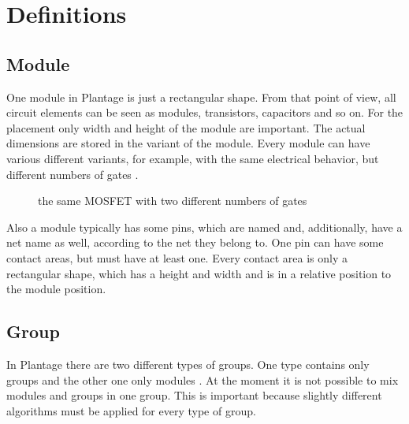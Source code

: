 \chapter{Definitions}

\section{Module}
One module in Plantage is just a rectangular shape. From that point of view, all circuit elements can be seen as modules, transistors, capacitors and so on. For the placement only width and height of the module are important. The actual dimensions are stored in the variant of the module. Every module can have various different variants, for example, with the same electrical behavior, but different numbers of gates .

\begin{figure}
	\centering
	
	\caption{the same MOSFET with two different numbers of gates}
	\label{fig:modules_with_different_gate_number}
\end{figure}

Also a module typically has some pins, which are named and, additionally, have a net name as well, according to the net they belong to. One pin can have some contact areas, but must have at least one. Every contact area is only a rectangular shape, which has a height and width and is in a relative position to the module position.

\section{Group}
In Plantage there are two different types of groups. One type contains only groups and the other one only modules . At the moment it is not possible to mix modules and groups in one group. This is important because slightly different algorithms must be applied for every type of group.

